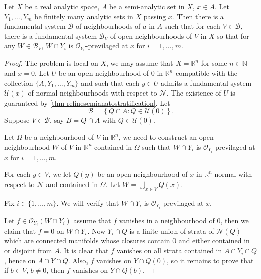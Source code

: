 \begin{proposition}\label{prop-fundamentalsysmopnhprevi}
    Let $X$ be a real analytic space, $A$ be a semi-analytic set in $X$, $x\in A$. Let $Y_1,\ldots,Y_m$ be finitely many analytic sets in $X$ passing $x$. Then there is a fundamental system $\mathcal{B}$ of neighbourhoods of $a$ in $A$ such that for each $V\in \mathcal{B}$, there is a fundamental system $\mathcal{B}_V$ of open neighbourhoods of $V$ in $X$ so that for any $W\in \mathcal{B}_V$, $W\cap Y_i$ is $\mathcal{O}_{Y_i}$-previlaged at $x$ for $i=1,\ldots,m$.
\end{proposition}
\begin{proof}
    The problem is local on $X$, we may assume that $X=\mathbb{R}^n$ for some $n\in \mathbb{N}$ and $x=0$. Let $U$ be an open neighbourhood of $0$ in $\mathbb{R}^n$ compatible with the collection $\{A,Y_1,\ldots,Y_m\}$ and such that each $y\in U$ admits a fundamental system $\mathcal{U}(x)$ of normal neighbourhoods with respect to $\mathcal{N}$. The existence of $U$ is guaranteed by \cref{thm-refinesemianatostratification}.
    Let
    \[
        \mathcal{B}=\left\{Q\cap A: Q\in \mathcal{U}(0)\right\}.  
    \]
    Suppose $V\in \mathcal{B}$, say $B=Q\cap A$ with $Q\in \mathcal{U}(0)$. 
    
    Let $\Omega$ be a neighbourhood of $V$ in $\mathbb{R}^n$, we need to construct an open neighbourhood $W$ of $V$ in $\mathbb{R}^n$ contained in $\Omega$ such that $W\cap Y_i$ is $\mathcal{O}_{Y_i}$-previlaged at $x$ for $i=1,\ldots,m$.

    For each $y\in V$, we let $Q(y)$ be an open neighbourhood of $x$ in $\mathbb{R}^n$ normal with respect to $\mathcal{N}$ and contained in $\Omega$.
    Let $W=\bigcup_{x\in V}Q(x)$.

    Fix $i\in \{1,\ldots,m\}$. We will verify that $W\cap Y_i$ is $\mathcal{O}_{Y_i}$-previlaged at $x$.

    Let $f\in \mathcal{O}_{Y_i}(W\cap Y_i)$ assume that $f$ vanishes in a neighbourhood of $0$, then we claim that $f=0$ on $W\cap Y_i$. Now $Y_i\cap Q$ is a finite union of strata of $\mathcal{N}(Q)$ which are connected manifolds whose closures contain $0$ and either contained in or disjoint from $A$. It is clear that $f$ vanishes on all strata contained in $A\cap Y_i\cap Q$, hence on $A\cap Y\cap  Q$. Also, $f$ vanishes on $Y\cap Q(0)$, so it remains to prove that if $b\in V$, $b\neq 0$, then $f$ vanishes on $Y\cap Q(b)$. 


\end{proof}
